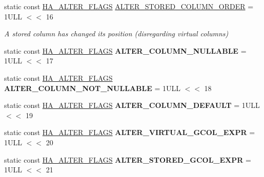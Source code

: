 \begin{DoxyCompactItemize}
static const \mbox{\hyperlink{classAlter__inplace__info_a45258f36b4942b5cabee7239463daaca}{H\+A\+\_\+\+A\+L\+T\+E\+R\+\_\+\+F\+L\+A\+GS}} \mbox{\hyperlink{classAlter__inplace__info_ac9163ccb2a66198096e9c4f0c8709a2d}{A\+L\+T\+E\+R\+\_\+\+S\+T\+O\+R\+E\+D\+\_\+\+C\+O\+L\+U\+M\+N\+\_\+\+O\+R\+D\+ER}} = 1\+U\+L\+L $<$$<$ 16
\begin{DoxyCompactList}\small\item\em A stored column has changed its position (disregarding virtual columns) \end{DoxyCompactList}\item 
\mbox{\label{classAlter__inplace__info_aa6c6c90494e5f48a3c817dc6788e6564}} 
static const \mbox{\hyperlink{classAlter__inplace__info_a45258f36b4942b5cabee7239463daaca}{H\+A\+\_\+\+A\+L\+T\+E\+R\+\_\+\+F\+L\+A\+GS}} {\bfseries A\+L\+T\+E\+R\+\_\+\+C\+O\+L\+U\+M\+N\+\_\+\+N\+U\+L\+L\+A\+B\+LE} = 1\+U\+L\+L $<$$<$ 17
\item 
\mbox{\label{classAlter__inplace__info_aa29e1f10312b58f38d0709a6c35786ed}} 
static const \mbox{\hyperlink{classAlter__inplace__info_a45258f36b4942b5cabee7239463daaca}{H\+A\+\_\+\+A\+L\+T\+E\+R\+\_\+\+F\+L\+A\+GS}} {\bfseries A\+L\+T\+E\+R\+\_\+\+C\+O\+L\+U\+M\+N\+\_\+\+N\+O\+T\+\_\+\+N\+U\+L\+L\+A\+B\+LE} = 1\+U\+L\+L $<$$<$ 18
\item 
\mbox{\label{classAlter__inplace__info_afb9565691c055b2b49ab2ec87ff7454d}} 
static const \mbox{\hyperlink{classAlter__inplace__info_a45258f36b4942b5cabee7239463daaca}{H\+A\+\_\+\+A\+L\+T\+E\+R\+\_\+\+F\+L\+A\+GS}} {\bfseries A\+L\+T\+E\+R\+\_\+\+C\+O\+L\+U\+M\+N\+\_\+\+D\+E\+F\+A\+U\+LT} = 1\+U\+L\+L $<$$<$ 19
\item 
\mbox{\label{classAlter__inplace__info_a84ad8fe94de590f02003f37cd6566907}} 
static const \mbox{\hyperlink{classAlter__inplace__info_a45258f36b4942b5cabee7239463daaca}{H\+A\+\_\+\+A\+L\+T\+E\+R\+\_\+\+F\+L\+A\+GS}} {\bfseries A\+L\+T\+E\+R\+\_\+\+V\+I\+R\+T\+U\+A\+L\+\_\+\+G\+C\+O\+L\+\_\+\+E\+X\+PR} = 1\+U\+L\+L $<$$<$ 20
\item 
\mbox{\label{classAlter__inplace__info_a304a4d869e675841bfb2723b6273e34a}} 
static const \mbox{\hyperlink{classAlter__inplace__info_a45258f36b4942b5cabee7239463daaca}{H\+A\+\_\+\+A\+L\+T\+E\+R\+\_\+\+F\+L\+A\+GS}} {\bfseries A\+L\+T\+E\+R\+\_\+\+S\+T\+O\+R\+E\+D\+\_\+\+G\+C\+O\+L\+\_\+\+E\+X\+PR} = 1\+U\+L\+L $<$$<$ 21

\end{DoxyCompactItemize}
